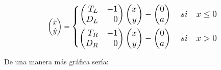 \documentclass[12pt,a4paper]{report} %
\begin{document}
	\begin{equation}
		\begin{pmatrix*}[r]
			\dot{x} \\ \dot{y}
		\end{pmatrix*}=
		\label{eq:lienardrl}
		\scalebox{1.2}{$\displaystyle
			\left\{
			\begin{aligned}
				\begin{pmatrix*}[r]
					T_L & -1\\
					D_L & 0
				\end{pmatrix*}\begin{pmatrix*}[r]
					x \\ y
				\end{pmatrix*}-\begin{pmatrix}
					0\\a
				\end{pmatrix} \quad si \quad x\leq 0 \\
				\begin{pmatrix*}[r]
					T_R & -1\\
					D_R & 0
				\end{pmatrix*}\begin{pmatrix*}[r]
					x \\ y
				\end{pmatrix*}-\begin{pmatrix}
					0\\a
				\end{pmatrix} \quad si \quad x > 0
			\end{aligned}
			\right. 
			$}
	\end{equation}\smallskip
	
	\noindent De una manera más gráfica sería:
	
\end{document}
